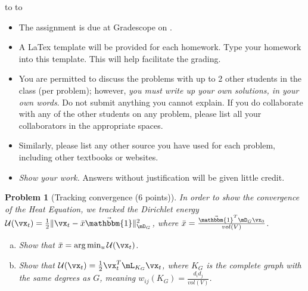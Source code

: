 \documentclass[10pt]{article}
\newcommand{\1}{\vec{\mathbbm{1}}}
\newcommand{\handout}{
\renewcommand{\thepage}{H\hnumber-\arabic{page}}
\noindent
\begin{center}
\vbox{
\hbox to \columnwidth {\sc{\course} --- \prof \hfill}
\vspace{-2mm}
\hbox to \columnwidth {\sc due \MakeLowercase{\duedate} \duelocation\hfill {\Huge\color{mdb}H\hnumber.\yourname}}
}
\end{center}
\vspace*{2mm}
}
\newtheorem{problem}{\sc\color{cit}Problem}
\begin{document}
\handout
\begin{itemize}
\item The assignment is due at Gradescope on \duedate.
\item A LaTex template will be provided for each homework. Type your homework into
this template. This will help facilitate the grading.
\item You are permitted to discuss the problems with up to 2 other students in the
class (per problem); however, {\em you must write up your own solutions, in your
own words}. Do not submit anything you cannot explain. If you do collaborate with
any of the other students on any problem, please list all your collaborators in the
appropriate spaces.
\item Similarly, please list any other source you have used for each problem,
including other textbooks or websites.
\item {\em Show your work.} Answers without justification will be given little
credit.
\end{itemize}
\newpage
\begin{problem}[Tracking convergence (6 points)]
In order to show the convergence of the Heat Equation, we tracked the Dirichlet
energy $\mathcal{U}(\vx_t) = \frac{1}{2}\|\vx_t - \bar{x} \1\|_{\mD_G}^2$, where $\bar{x} = \frac{\1^T\mD_G \vx_0}{vol(V)}$.
\begin{enumerate}[(a)]
\item Show that $\bar{x} = \arg \min_{u} \mathcal{U}(\vx_t)$.
\item Show that $\mathcal{U}(\vx_t) = \frac{1}{2}\vx_t^T \mL_{K_G} \vx_t$,
where $K_G$ is the complete graph with the same degrees as $G$, meaning $w_{ij}
(K_G) = \frac{d_i d_j}{vol(V)}$.
\end{enumerate}
\end{problem}
\end{document}
